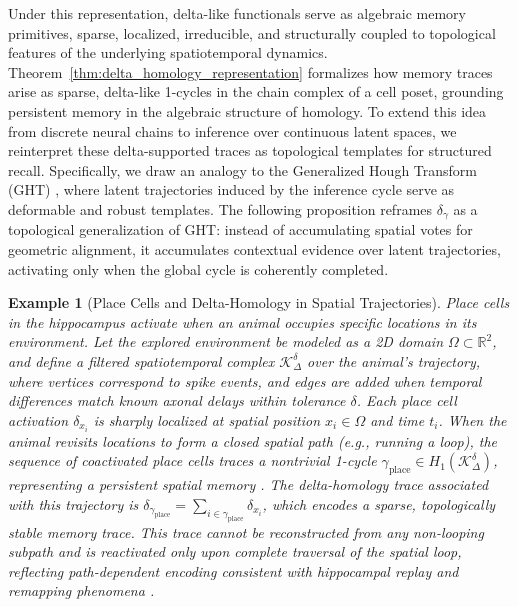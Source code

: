 \documentclass[lettersize,journal]{IEEEtran}
\newtheorem{example}{Example}
\begin{document}
Under this representation, delta-like functionals serve as algebraic memory primitives, sparse, localized, irreducible, and structurally coupled to topological features of the underlying spatiotemporal dynamics.
Theorem~\ref{thm:delta_homology_representation} formalizes how memory traces arise as sparse, delta-like 1-cycles in the chain complex of a cell poset, grounding persistent memory in the algebraic structure of homology. To extend this idea from discrete neural chains to inference over continuous latent spaces, we reinterpret these delta-supported traces as topological templates for structured recall. Specifically, we draw an analogy to the Generalized Hough Transform (GHT) \cite{ballard1981generalizing}, where latent trajectories induced by the inference cycle serve as deformable and robust templates. The following proposition reframes \( \delta_\gamma \) as a topological generalization of GHT: instead of accumulating spatial votes for geometric alignment, it accumulates contextual evidence over latent trajectories, activating only when the global cycle is coherently completed. %

\begin{example}[Place Cells and Delta-Homology in Spatial Trajectories]
Place cells in the hippocampus activate when an animal occupies specific locations in its environment. Let the explored environment be modeled as a 2D domain \( \Omega \subset \mathbb{R}^2 \), and define a filtered spatiotemporal complex \( \mathcal{K}_\Delta^\delta \) over the animal’s trajectory, where vertices correspond to spike events, and edges are added when temporal differences match known axonal delays within tolerance \( \delta \). Each place cell activation \( \delta_{x_i} \) is sharply localized at spatial position \( x_i \in \Omega \) and time \( t_i \).
When the animal revisits locations to form a closed spatial path (e.g., running a loop), the sequence of coactivated place cells traces a nontrivial 1-cycle \( \gamma_{\text{place}} \in H_1(\mathcal{K}_\Delta^\delta) \), representing a persistent spatial memory \cite{tversky2005functional}. The delta-homology trace associated with this trajectory is
$\delta_{\gamma_{\text{place}}} = \sum_{i \in \gamma_{\text{place}}} \delta_{x_i}$,
which encodes a sparse, topologically stable memory trace. This trace cannot be reconstructed from any non-looping subpath and is reactivated only upon complete traversal of the spatial loop, reflecting path-dependent encoding consistent with hippocampal replay and remapping phenomena \cite{o1978hippocampus, wilson1994reactivation}.
\end{example}
\end{document}
